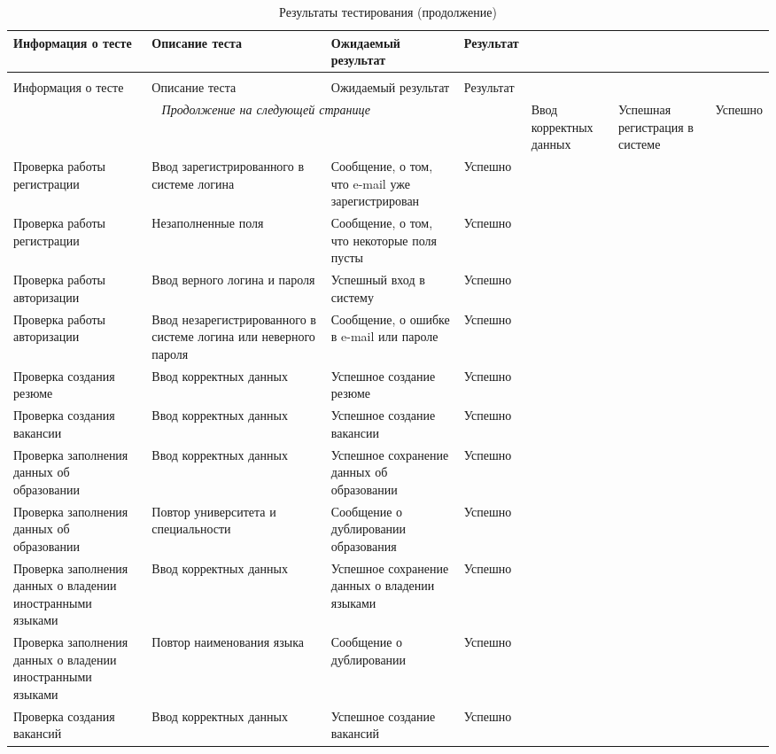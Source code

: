 \begin{longtable}[ht]{|p{}|p{}|p{}|p{}|}
\caption{Результаты тестирования}\label{tab:tab-test-results} \\
\hline
Информация о тесте & Описание теста & Ожидаемый результат  & Результат \\
\hline\hline\endfirsthead
\caption{Результаты тестирования (продолжение)} \\
\hline
Информация о тесте & Описание теста & Ожидаемый результат  & Результат \\
\hline\hline\endhead
\hline
\multicolumn{4}{c}{\textit{Продолжение на следующей странице}}
\endfoot
\endlastfoot
Проверка работы регистрации & Ввод корректных данных & Успешная регистрация в системе & Успешно \\
\hline
Проверка работы регистрации & Ввод зарегистрированного в системе логина& Сообщение, о том, что e-mail уже зарегистрирован & Успешно \\
\hline
Проверка работы регистрации & Незаполненные поля& Сообщение, о том, что некоторые поля пусты & Успешно \\
\hline
Проверка работы авторизации & Ввод верного логина и пароля & Успешный вход в систему & Успешно \\
\hline
Проверка работы авторизации & Ввод незарегистрированного в системе логина или неверного пароля & Сообщение, о ошибке в e-mail или пароле & Успешно \\
\hline
Проверка создания резюме  & Ввод корректных данных & Успешное создание резюме & Успешно \\
\hline
Проверка создания вакансии  & Ввод корректных данных & Успешное создание вакансии & Успешно \\
\hline
Проверка заполнения данных об образовании & Ввод корректных данных & Успешное сохранение данных об образовании & Успешно \\
\hline
Проверка заполнения данных об образовании & Повтор университета и специальности &  Сообщение о дублировании образования & Успешно \\
\hline
Проверка заполнения данных о владении иностранными языками & Ввод корректных данных & Успешное сохранение данных о владении языками & Успешно \\
\hline
Проверка заполнения данных о владении иностранными языками & Повтор наименования языка &  Сообщение о дублировании & Успешно \\
\hline
Проверка создания вакансий  & Ввод корректных данных & Успешное создание вакансий & Успешно \\

\end{longtable}
